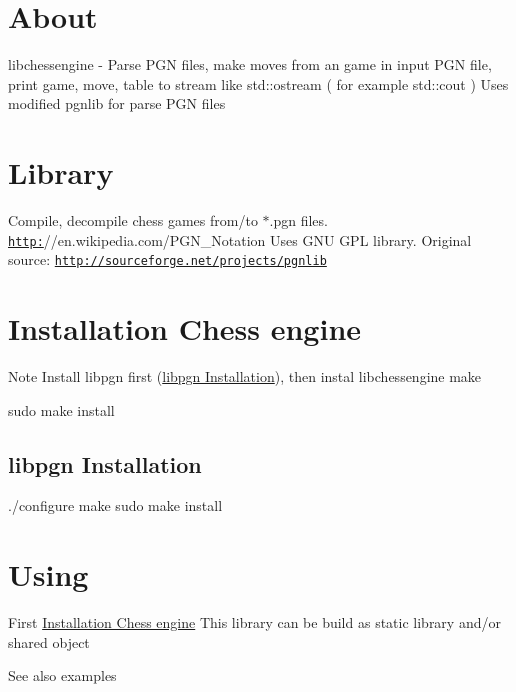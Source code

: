 \hypertarget{README_About}{}\section{About}\label{README_About}
libchessengine -\/ Parse PGN files, make moves from an game in input PGN file, print game, move, table to stream like std::ostream ( for example std::cout ) Uses modified pgnlib for parse PGN files\hypertarget{README_pgnlib}{}\section{Library}\label{README_pgnlib}
Compile, decompile chess games from/to $\ast$.pgn files. \href{http:}{\tt http:}//en.wikipedia.com/PGN\_\-Notation Uses GNU GPL library. Original source: \href{http://sourceforge.net/projects/pgnlib}{\tt http://sourceforge.net/projects/pgnlib}\hypertarget{README__inst_}{}\section{Installation Chess engine}\label{README__inst_}
\begin{DoxyNote}{Note}
Install libpgn first (\hyperlink{README__lpgninst_}{libpgn Installation}), then instal libchessengine make 
\end{DoxyNote}
sudo make install \hypertarget{README__lpgninst_}{}\subsection{libpgn Installation}\label{README__lpgninst_}
./configure make sudo make install \hypertarget{README_Using}{}\section{Using}\label{README_Using}
First \hyperlink{README__inst_}{Installation Chess engine} This library can be build as static library and/or shared object \begin{DoxySeeAlso}{See also}
examples 
\end{DoxySeeAlso}
